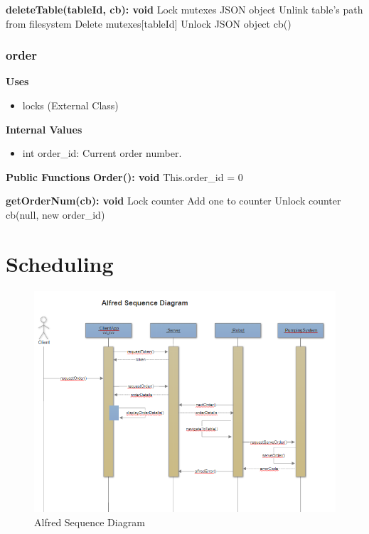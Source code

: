 \documentclass [10pt]{article}
\begin{document}
\textbf{deleteTable(tableId, cb): void}
Lock mutexes JSON object
Unlink table's path from filesystem
Delete mutexes[tableId]
Unlock JSON object
cb()


\subsubsection{order}
\textbf{Uses}
\begin{itemize}
	\item locks (External Class)
\end{itemize}

\textbf{Internal Values}
\begin{itemize}
	\item int order\_id: Current order number.
\end{itemize}

\textbf{Public Functions}
\textbf{Order(): void}
This.order\_id = 0

\textbf{getOrderNum(cb): void}
Lock counter
Add one to counter
Unlock counter
cb(null, new order\_id)




\section {Scheduling}

\begin{figure}[h!]
	\centering
	\includegraphics [scale = 0.6] {figures/Alfred_SequenceDiagram.png}
	\caption{Alfred Sequence Diagram}
\end{figure}
\end{document}
